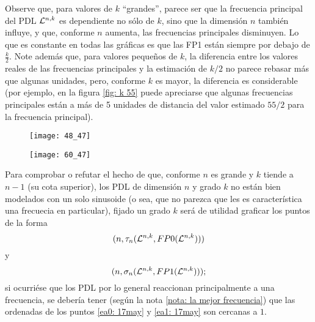 Observe que, para valores de $k$ ``grandes'', parece ser que 
la frecuencia principal del PDL $\mathcal{L}^{n,k}$
es dependiente no sólo de $k$, sino que la dimensión $n$
también influye, y que, conforme $n$ aumenta, las
frecuencias principales disminuyen.
Lo que es constante en todas las gráficas es que 
las FP1 están siempre por debajo de
$\frac{k}{2}$.
Note además que, para valores pequeños de $k$, la diferencia
entre los valores reales de las frecuencias principales
y la estimación de $k/2$ no parece rebasar más que algunas
unidades, pero, conforme $k$ es mayor, la diferencia
es considerable (por ejemplo, en la figura \ref{fig: k 55}
puede apreciarse que algunas frecuencias principales están
a más de 5 unidades de distancia del valor estimado $55/2$
para la frecuencia principal). 

\begin{figure}[H]
	\centering
	\texttt{[image: 48\_47]} 
\end{figure}
\begin{figure}[H]
	\centering
	\texttt{[image: 60\_47]} 
\end{figure}


Para comprobar o refutar el hecho de que, conforme $n$ 
es grande y $k$ tiende a $n-1$ (su cota superior),
los PDL de dimensión $n$ y grado $k$ no están bien
modelados con un solo sinusoide (o sea, que no parezca que les
es característica una frecuecia en particular), 
fijado un grado $k$
será de utilidad
graficar los puntos de la forma
\begin{equation}
\label{ea0: 17may}
(n, \tau_{n}(\mathcal{L}^{n,k}, FP0(\mathcal{L}^{n,k})))
\end{equation}
y
\begin{equation}
\label{ea1: 17may}
(n, \sigma_{n}(\mathcal{L}^{n,k}, FP1(\mathcal{L}^{n,k})));
\end{equation}
si ocurriése que los PDL por lo general reaccionan
principalmente a una frecuencia, se debería tener 
(según la nota 
\ref{nota: la mejor frecuencia}) que
las ordenadas de los puntos
\eqref{ea0: 17may} y \eqref{ea1: 17may}
son cercanas a $1$.


